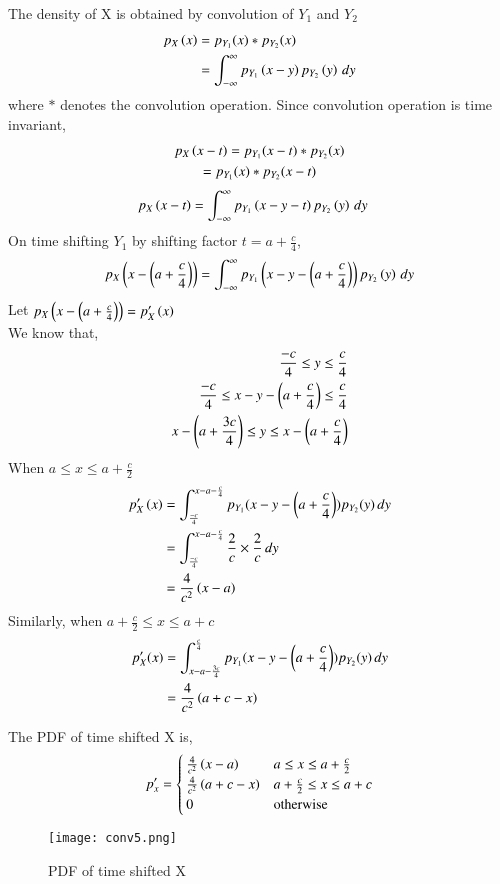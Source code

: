 \documentclass[journal,12pt,twocolumn]{IEEEtran}
\begin{document}
The density of X is obtained by convolution of $Y_1$ and $Y_2$
\begin{align}
p_X\left(x\right) &= p_{Y_1}(x)*p_{Y_2}(x)\\
&=  \int_{- \infty}^{\infty} p_{Y_1}\left(x-y\right)p_{Y_2}\left(y\right)\,dy
\end{align}
where $*$ denotes the convolution operation. Since convolution operation is time invariant, 
\begin{multline}
    p_X\left(x-t\right) = p_{Y_1}(x-t)*p_{Y_2}(x) \\ = p_{Y_1}(x)*p_{Y_2}(x-t)
\end{multline}
\begin{align}
    p_X\left(x-t\right) &=  \int_{- \infty}^{\infty} p_{Y_1}\left(x-y-t\right)p_{Y_2}\left(y\right)\,dy
\end{align}
On time shifting $Y_1$ by shifting factor $t=a+\frac{c}{4}$, 
\begin{align}
    p_X\left(x-\left(a+\frac{c}{4}\right)\right) =  \int_{- \infty}^{\infty} p_{Y_1}\left(x-y-\left(a+\frac{c}{4}\right)\right)p_{Y_2}\left(y\right)\,dy
\end{align}
Let $p_X\left(x-\left(a+\frac{c}{4}\right)\right)=p_X'\left(x\right)$\\
We know that, 
\begin{align}
    \label{eq1} \frac{-c}{4}\leq y \leq \frac{c}{4}\\ 
    \frac{-c}{4}\le x-y-\left(a+\frac{c}{4}\right) \le \frac{c}{4}\\
    \label{eq2} x-\left(a+\frac{3c}{4}\right)\le y \le x-\left(a+\frac{c}{4}\right)
\end{align}
When $a \le x \le a+\frac{c}{2}$
\begin{align}
    p_X'\left(x\right) & = \int_{\frac{-c}{4}}^{x-a-\frac{c}{4}} p_{Y_1}(x-y-\left(a+\frac{c}{4}\right))p_{Y_2}(y)\,dy\\
    & = \int_{\frac{-c}{4}}^{x-a-\frac{c}{4}} \frac{2}{c}\times\frac{2}{c}\,dy\\
    & = \frac{4}{c^2}\left(x-a\right)
\end{align}
Similarly, when $a+\frac{c}{2} \le x \le a+c $
\begin{align}
    p_X'(x) & = \int_{x-a-\frac{3c}{4}}^{\frac{c}{4}} p_{Y_1}(x-y-\left(a+\frac{c}{4}\right))p_{Y_2}(y)\,dy\\
    & = \frac{4}{c^2}\left(a+c-x\right)
\end{align}

The PDF of time shifted X is,
\begin{align}
p_x' = 
\begin{cases}
\frac{4}{c^2}\left(x-a\right) & a \le x \le a+\frac{c}{2}\\
\frac{4}{c^2}\left(a+c-x\right) & a+\frac{c}{2} \le x \le a+c \\
0 & \text{otherwise}
\end{cases}
\end{align}
\begin{figure}[h!]
\centering
\texttt{[image: conv5.png]}
\caption{PDF of time shifted X}
\label{fig:convolution}
\end{figure}
\end{document}
